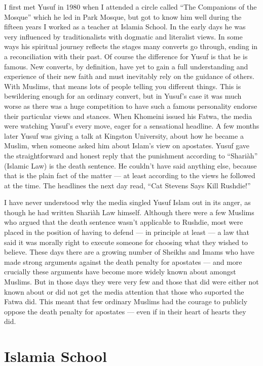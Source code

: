 \documentclass[12pt]{memoir}
\begin{document}
I first met Yusuf in 1980 when I attended a circle called
“The Companions of the Mosque” which he led
in  Park Mosque,
but got to know him well during the fifteen years
I worked as a teacher at Islamia School.
In the early days he was very influenced by traditionalists
with dogmatic and literalist views.
In some ways his spiritual journey reflects the stages
many converts go through, ending in a reconciliation with their past.
Of course the difference for Yusuf is that he is famous.
New converts, by definition, have yet to gain a full understanding
and experience of their new faith
and must inevitably rely on the guidance of others.
With Muslims, that means lots of people telling you different things.
This is bewildering enough for an ordinary convert,
but in Yusuf’s case it was much worse as there was a huge competition
to have such a famous personality endorse their particular views and stances.
When Khomeini issued his Fatwa, the media were watching Yusuf’s every move,
eager for a sensational headline.
A few months later Yusuf was giving a talk at Kingston University,
about how he became a Muslim,
when someone asked him about Islam’s view on apostates.
Yusuf gave the straightforward and honest reply
that the punishment according to “Shari\`ah” (Islamic Law)
is the death sentence.
He couldn’t have said anything else,
because that is the plain fact of the matter —
at least according to the views he followed at the time.
The headlines the next day read, “Cat Stevens Says Kill Rushdie!”

I have never understood why the media singled Yusuf Islam out in its anger,
as though he had written Shari\`ah Law himself.
Although there were a few Muslims who argued that the death sentence
wasn’t applicable to Rushdie,
most were placed in the position of having to defend —
in principle at least —
a law that said it was morally right to execute someone
for choosing what they wished to believe.
These days there are a growing number of Sheikhs and Imams
who have made strong arguments against the death penalty for apostates —
and more crucially these arguments have become
more widely known about amongst Muslims.
But in those days they were very few and those that did
were either not known about or did not get
the media attention that those who suported the Fatwa did.
This meant that few ordinary Muslims had the courage
to publicly oppose the death penalty for apostates —
even if in their heart of hearts they did.


\chapter{Islamia School}
\end{document}
